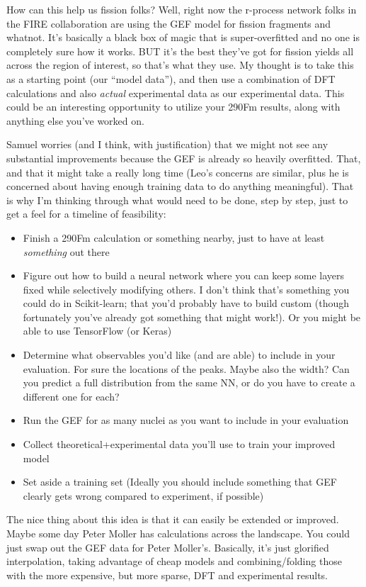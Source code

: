How can this help us fission folks? Well, right now the r-process network folks in the FIRE collaboration are using the GEF model for fission fragments and whatnot. It's basically a black box of magic that is super-overfitted and no one is completely sure how it works. BUT it's the best they've got for fission yields all across the region of interest, so that's what they use. My thought is to take this as a starting point (our ``model data''), and then use a combination of DFT calculations and also \textit{actual} experimental data as our experimental data. This could be an interesting opportunity to utilize your 290Fm results, along with anything else you've worked on.

Samuel worries (and I think, with justification) that we might not see any substantial improvements because the GEF is already so heavily overfitted. That, and that it might take a really long time (Leo's concerns are similar, plus he is concerned about having enough training data to do anything meaningful). That is why I'm thinking through what would need to be done, step by step, just to get a feel for a timeline of feasibility:

\begin{itemize}
	\item Finish a 290Fm calculation or something nearby, just to have at least \textit{something} out there
	\item Figure out how to build a neural network where you can keep some layers fixed while selectively modifying others. I don't think that's something you could do in Scikit-learn; that you'd probably have to build custom (though fortunately you've already got something that might work!). Or you might be able to use TensorFlow (or Keras)
	\item Determine what observables you'd like (and are able) to include in your evaluation. For sure the locations of the peaks. Maybe also the width? Can you predict a full distribution from the same NN, or do you have to create a different one for each?
	\item Run the GEF for as many nuclei as you want to include in your evaluation
	\item Collect theoretical+experimental data you'll use to train your improved model
	\item Set aside a training set (Ideally you should include something that GEF clearly gets wrong compared to experiment, if possible)
\end{itemize}

The nice thing about this idea is that it can easily be extended or improved. Maybe some day Peter Moller has calculations across the landscape. You could just swap out the GEF data for Peter Moller's. Basically, it's just glorified interpolation, taking advantage of cheap models and combining/folding those with the more expensive, but more sparse, DFT and experimental results.

